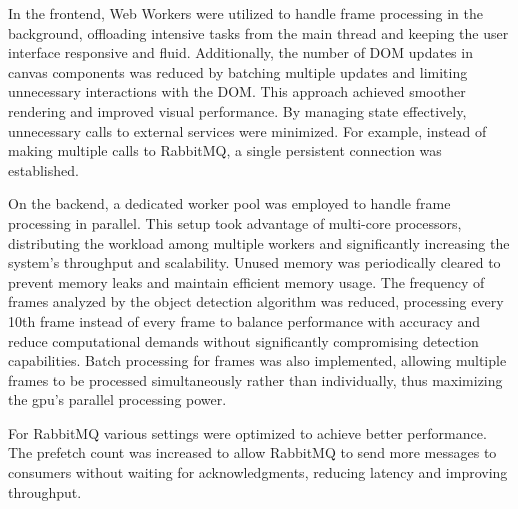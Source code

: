 In the frontend, Web Workers were utilized to handle frame processing in the background, offloading intensive 
tasks from the main thread and keeping the user interface responsive and fluid.
Additionally, the number of DOM updates in canvas components was reduced by batching multiple updates and limiting 
unnecessary interactions with the DOM. This approach achieved smoother rendering and improved visual performance.
By managing state effectively, unnecessary calls to external services were minimized. For example, instead of making 
multiple calls to RabbitMQ, a single persistent connection was established.

On the backend, a dedicated worker pool was employed to handle frame processing in parallel. This setup took 
advantage of multi-core processors, distributing the workload among multiple workers and significantly increasing 
the system's throughput and scalability. Unused memory was periodically cleared to prevent memory leaks and maintain 
efficient memory usage.
The frequency of frames analyzed by the object detection algorithm was reduced, processing every 10th frame 
instead of every frame to balance performance with accuracy and reduce computational demands without significantly 
compromising detection capabilities.
Batch processing for frames was also implemented, allowing multiple frames to be processed simultaneously rather 
than individually, thus maximizing the \ac{gpu}'s parallel processing power.

For RabbitMQ various settings were optimized to achieve better performance. The prefetch count was increased to 
allow RabbitMQ to send more messages to consumers without waiting for acknowledgments, reducing latency and improving 
throughput.
